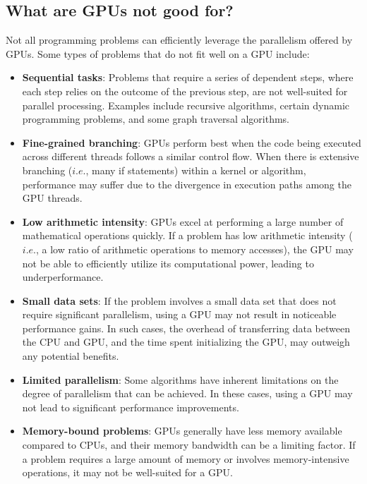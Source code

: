 \subsection{What are GPUs not good for?}


\par
Not all programming problems can efficiently leverage the parallelism offered by GPUs.
Some types of problems that do not fit well on a GPU include:
\begin{itemize}
    \item \textbf{Sequential tasks}: Problems that require a series of dependent steps, where each step relies on the outcome of the previous step, are not well-suited for parallel processing. Examples include recursive algorithms, certain dynamic programming problems, and some graph traversal algorithms.
    \item \textbf{Fine-grained branching}: GPUs perform best when the code being executed across different threads follows a similar control flow. When there is extensive branching ($i.e.$, many if statements) within a kernel or algorithm, performance may suffer due to the divergence in execution paths among the GPU threads.
    \item \textbf{Low arithmetic intensity}: GPUs excel at performing a large number of mathematical operations quickly. If a problem has low arithmetic intensity ($i.e.$, a low ratio of arithmetic operations to memory accesses), the GPU may not be able to efficiently utilize its computational power, leading to underperformance.
    \item \textbf{Small data sets}: If the problem involves a small data set that does not require significant parallelism, using a GPU may not result in noticeable performance gains. In such cases, the overhead of transferring data between the CPU and GPU, and the time spent initializing the GPU, may outweigh any potential benefits.
    \item \textbf{Limited parallelism}: Some algorithms have inherent limitations on the degree of parallelism that can be achieved. In these cases, using a GPU may not lead to significant performance improvements.
    \item \textbf{Memory-bound problems}: GPUs generally have less memory available compared to CPUs, and their memory bandwidth can be a limiting factor. If a problem requires a large amount of memory or involves memory-intensive operations, it may not be well-suited for a GPU.
\end{itemize}


